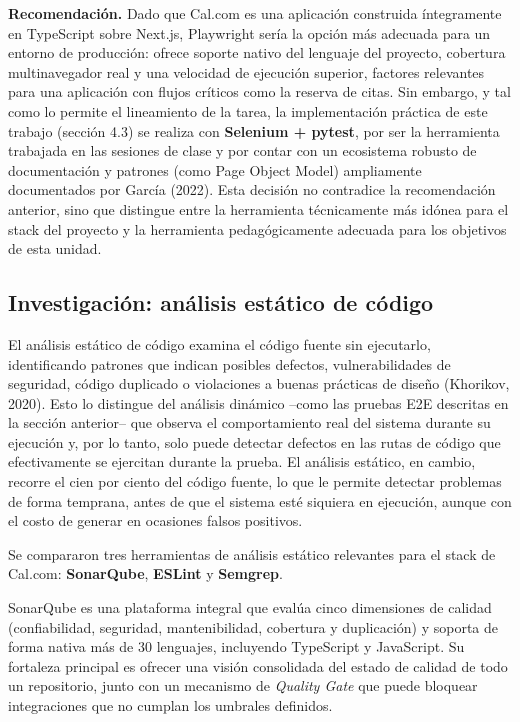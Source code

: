 \documentclass[12pt,a4paper]{article}
\begin{document}
\textbf{Recomendación.} Dado que Cal.com es una aplicación construida
íntegramente en TypeScript sobre Next.js, Playwright sería la
opción más adecuada para un entorno de producción: ofrece soporte
nativo del lenguaje del proyecto, cobertura multinavegador real y
una velocidad de ejecución superior, factores relevantes para una
aplicación con flujos críticos como la reserva de citas. Sin
embargo, y tal como lo permite el lineamiento de la tarea, la
implementación práctica de este trabajo (sección 4.3) se realiza con
\textbf{Selenium + pytest}, por ser la herramienta trabajada en las
sesiones de clase y por contar con un ecosistema robusto de
documentación y patrones (como Page Object Model) ampliamente
documentados por García (2022). Esta decisión no contradice la
recomendación anterior, sino que distingue entre la herramienta
técnicamente más idónea para el stack del proyecto y la herramienta
pedagógicamente adecuada para los objetivos de esta unidad.



\subsection{Investigación: análisis estático de código}

El análisis estático de código examina el código fuente sin
ejecutarlo, identificando patrones que indican posibles defectos,
vulnerabilidades de seguridad, código duplicado o violaciones a
buenas prácticas de diseño (Khorikov, 2020). Esto lo distingue del
análisis dinámico --como las pruebas E2E descritas en la sección
anterior-- que observa el comportamiento real del sistema durante su
ejecución y, por lo tanto, solo puede detectar defectos en las rutas
de código que efectivamente se ejercitan durante la prueba. El
análisis estático, en cambio, recorre el cien por ciento del código
fuente, lo que le permite detectar problemas de forma temprana, antes
de que el sistema esté siquiera en ejecución, aunque con el costo de
generar en ocasiones falsos positivos.

Se compararon tres herramientas de análisis estático relevantes para
el stack de Cal.com: \textbf{SonarQube}, \textbf{ESLint} y
\textbf{Semgrep}.

SonarQube es una plataforma integral que evalúa cinco dimensiones de
calidad (confiabilidad, seguridad, mantenibilidad, cobertura y
duplicación) y soporta de forma nativa más de 30 lenguajes,
incluyendo TypeScript y JavaScript. Su fortaleza principal es ofrecer
una visión consolidada del estado de calidad de todo un repositorio,
junto con un mecanismo de \emph{Quality Gate} que puede bloquear
integraciones que no cumplan los umbrales definidos.
\end{document}
